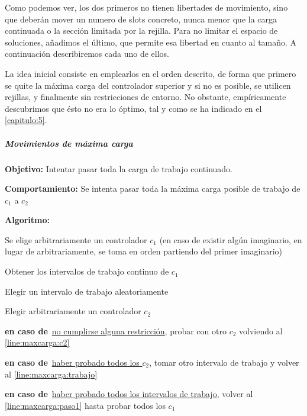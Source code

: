 Como podemos ver, los dos primeros no tienen libertades de movimiento, sino que deberán mover un numero de slots concreto, nunca menor que la carga continuada o la sección limitada por la rejilla. Para no limitar el espacio de soluciones, añadimos el último, que permite esa libertad en cuanto al tamaño. A continuación describiremos cada uno de ellos.

La idea inicial consiste en emplearlos en el orden descrito, de forma que primero se quite la máxima carga del controlador superior y si no es posible, se utilicen rejillas, y finalmente sin restricciones de entorno. No obstante, empíricamente descubrimos que ésto no era lo óptimo, tal y como se ha indicado en el \autoref{capitulo:5}.

\subparagraph{Movimientos de máxima carga}
\label{entorno:movMaxCarga}

\textbf{Objetivo:} Intentar pasar toda la carga de trabajo continuado.

\textbf{Comportamiento:} Se intenta pasar toda la máxima carga posible de trabajo de $c_1$ a $c_2$

\textbf{Algoritmo:}
\SetAlgoNoLine
\LinesNumbered
\SetAlgoNoEnd
\DontPrintSemicolon
\begin{algorithm}[h]
	\label{algoritmo:movMaxCarga}
	\SetAlgoNoEnd
	Se elige arbitrariamente un controlador $c_1$ (en caso de existir algún imaginario, en lugar de arbitrariamente, se toma en orden partiendo del primer imaginario) \label{line:maxcarga:paso1}\;
	\algovspace
	
	Obtener los intervalos de trabajo continuo de $c_1$\;
	\algovspace
	
	Elegir un intervalo de trabajo aleatoriamente \label{line:maxcarga:trabajo}\;
	\algovspace
	
	Elegir arbitrariamente un controlador $c_2$ \label{line:maxcarga:c2}\;
	\algovspace
	
	\algovspace
	
	\textbf{en caso de\,} \underline{no cumplirse alguna restricción}, probar con otro $c_2$ volviendo al \autoref{line:maxcarga:c2}\;
	\algovspace
	
	\textbf{en caso de\,} \underline{haber probado todos los $c_2$}, tomar otro intervalo de trabajo y volver al \autoref{line:maxcarga:trabajo}\;
	\algovspace
	
	\textbf{en caso de\,} \underline{haber probado todos los intervalos de trabajo}, volver al \autoref{line:maxcarga:paso1} hasta probar todos los $c_1$\;
	\algovspace
\end{algorithm}

